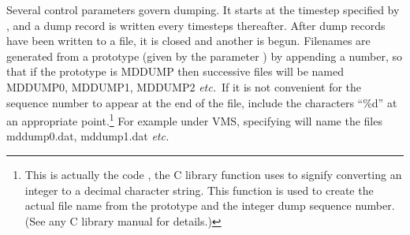 \documentclass[a4paper,twoside]{report}
\newcommand{\Fname}[1]{{\upshape\mdseries\sffamily#1}}
\newcommand{\etc}{\emph{etc.}}
\begin{document}
Several control parameters govern dumping. It starts at the timestep
specified by , and a dump record is written every
 timesteps thereafter.  After 
dump records have been written to a file, it is closed and another is
begun. Filenames are generated from a prototype (given by the
parameter ) by appending a number, so that if the
prototype is \Fname{MDDUMP} then successive files will be named
\Fname{MDDUMP0}, \Fname{MDDUMP1}, \Fname{MDDUMP2} \etc\ If it is
not convenient for the sequence number to appear at the end of the
file, include the characters ``\%d'' at an appropriate
point.\footnote{This is actually the code , the C
  library function uses to signify converting an integer to a decimal
  character string. This function is used to create the actual file
  name from the prototype and the integer dump sequence number. (See
  any C library manual for details.)}  For example under VMS,
specifying  will name the files
\Fname{mddump0.dat}, \Fname{mddump1.dat} \etc
\end{document}
